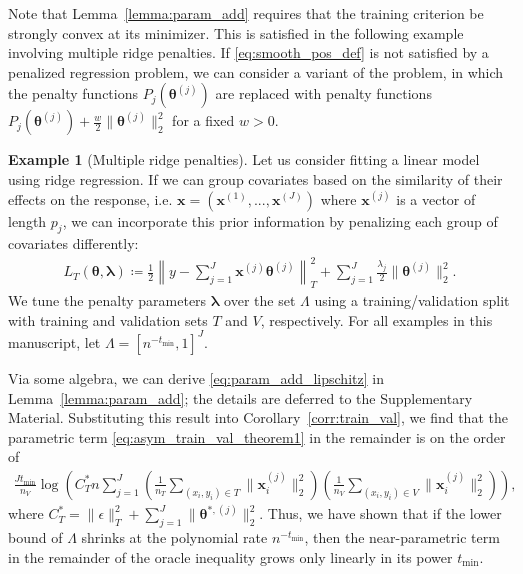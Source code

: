 \documentclass[12pt]{article} %
\theoremstyle{definition}
\newtheorem{example}{Example}
\begin{document}
\noindent Note that Lemma~\ref{lemma:param_add} requires that the training criterion be strongly convex at its minimizer.
This is satisfied in the following example involving multiple ridge penalties.
If \eqref{eq:smooth_pos_def} is not satisfied by a penalized regression problem, we can consider a variant of the problem, in which the penalty functions $P_j(\boldsymbol{\theta}^{(j)})$ are replaced with penalty functions
$P_j(\boldsymbol{\theta}^{(j)}) + \frac{w}{2}\| \boldsymbol{\theta}^{(j)} \|_2^2$ for a fixed $w > 0$.
\begin{example}[Multiple ridge penalties]
	\label{ex:ridge}
	Let us consider fitting a linear model using ridge regression.
	If we can group covariates based on the similarity of their effects on the response, i.e. $\boldsymbol{x} = (\boldsymbol{x}^{(1)}, ... , \boldsymbol{x}^{(J)})$ where $\boldsymbol{x}^{(j)}$ is a vector of length $p_j$, we can incorporate this prior information by penalizing each group of covariates differently:
	\begin{align}
	L_T \left (\boldsymbol{\theta}, \boldsymbol{\lambda} \right)
	\coloneqq
	\frac{1}{2}
	\left\|
	y -  \sum_{j=1}^J \boldsymbol{x}^{(j)} \boldsymbol{\theta}^{(j)}
	\right \|^2_T
	+ \sum_{j=1}^J \frac{\lambda_j}{2} \|\boldsymbol{\theta}^{(j)}\|_2^2.
	\end{align}
	We tune the penalty parameters $\boldsymbol{\lambda}$ over the set $\Lambda$ using a training/validation split with training and validation sets $T$ and $V$, respectively.
	For all examples in this manuscript, let $\Lambda = \left [n^{- t_{\min}}, 1 \right ]^J$.

	Via some algebra, we can derive \eqref{eq:param_add_lipschitz} in Lemma~\ref{lemma:param_add}; the details are deferred to the Supplementary Material.
	Substituting this result into Corollary~\ref{corr:train_val}, we find that the parametric term \eqref{eq:asym_train_val_theorem1} in the remainder is on the order of
	\begin{align}
	\frac{J t_{\min}}{n_{V}}
	\log \left (
	C^*_T n
	\sum_{j = 1}^J
	\left(\frac{1}{n_T} \sum_{(x_i, y_i) \in T} \|\boldsymbol{x}_i^{(j)}\|^2_2\right)
	\left(\frac{1}{n_V} \sum_{(x_i, y_i) \in V} \|\boldsymbol{x}_i^{(j)}\|^2_2\right)
	\right ),
	\end{align}
	where $
	C^*_{T} =
	\|\epsilon\|_{T}^{2}
	+ \sum_{j=1}^J \|\boldsymbol{\theta}^{*,(j)}\|_2^2
	.$
Thus, we have shown that if the lower bound of $\Lambda$ shrinks at the polynomial rate $n^{-t_{\min}}$, then the near-parametric term in the remainder of the oracle inequality grows only linearly in its power $t_{\min}$.
\end{example}
\end{document}
